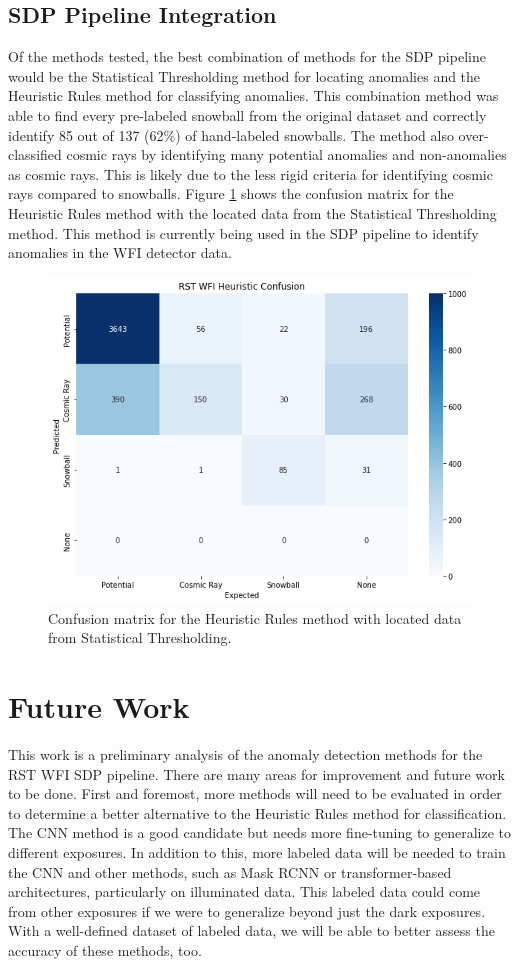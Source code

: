 \subsection{SDP Pipeline Integration}
Of the methods tested, the best combination of methods for the SDP pipeline would be the Statistical Thresholding method for locating anomalies and the Heuristic Rules method for classifying anomalies.
This combination method was able to find every pre-labeled snowball from the original dataset and correctly identify 85 out of 137 (62\%) of hand-labeled snowballs. 
The method also over-classified cosmic rays by identifying many potential anomalies and non-anomalies as cosmic rays.
This is likely due to the less rigid criteria for identifying cosmic rays compared to snowballs.
Figure \ref{rst/fig:heuristic_confusion} shows the confusion matrix for the Heuristic Rules method with the located data from the Statistical Thresholding method.
This method is currently being used in the SDP pipeline to identify anomalies in the WFI detector data.

\begin{figure}
    \centering
    \includegraphics[width=.7\textwidth]{figs/rst/heuristic_confusion.png}
    \caption[Confusion Matrix for Heuristic Rules with Statistical Thresholding]{Confusion matrix for the Heuristic Rules method with located data from Statistical Thresholding.}
    \label{rst/fig:heuristic_confusion}
\end{figure}

\section{Future Work}
\label{rst/sec:future}
This work is a preliminary analysis of the anomaly detection methods for the RST WFI SDP pipeline.
There are many areas for improvement and future work to be done.
First and foremost, more methods will need to be evaluated in order to determine a better alternative to the Heuristic Rules method for classification. 
The CNN method is a good candidate but needs more fine-tuning to generalize to different exposures.
In addition to this, more labeled data will be needed to train the CNN and other methods, such as Mask RCNN or transformer-based architectures, particularly on illuminated data.
This labeled data could come from other exposures if we were to generalize beyond just the dark exposures.
With a well-defined dataset of labeled data, we will be able to better assess the accuracy of these methods, too. 

